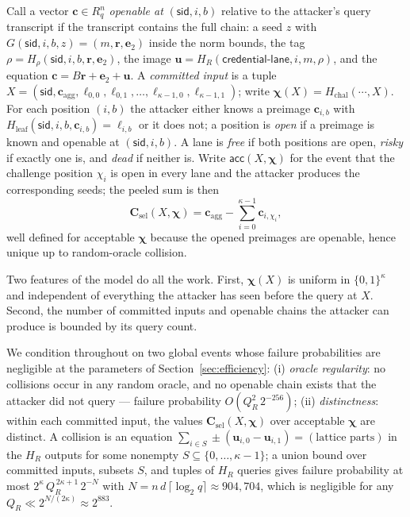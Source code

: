 \documentclass[11pt]{article}
\newcommand{\R}{R_q}
\begin{document}
Call a vector $\mathbf c\in\R^{n}$ \emph{openable at}
$(\mathsf{sid},i,b)$ relative to the attacker's query transcript if the
transcript contains the full chain: a seed $z$ with
$G(\mathsf{sid},i,b,z)=(m,\mathbf r,\mathbf e_2)$ inside the norm bounds,
the tag $\rho=H_\rho(\mathsf{sid},i,b,\mathbf r,\mathbf e_2)$, the image
$\mathbf u=H_R(\mathsf{credential\mbox{-}lane},i,m,\rho)$, and the equation
$\mathbf c=B\mathbf r+\mathbf e_2+\mathbf u$.  A \emph{committed input} is a
tuple $X=(\mathsf{sid},\mathbf c_{\mathrm{agg}},\ell_{0,0},\ell_{0,1},
\ldots,\ell_{\kappa-1,0},\ell_{\kappa-1,1})$; write
$\boldsymbol\chi(X)=H_{\mathrm{chal}}(\cdots,X)$.  For each position $(i,b)$
the attacker either knows a preimage $\mathbf c_{i,b}$ with
$H_{\mathrm{leaf}}(\mathsf{sid},i,b,\mathbf c_{i,b})=\ell_{i,b}$ or it does
not; a position is \emph{open} if a preimage is known and openable at
$(\mathsf{sid},i,b)$.  A lane is \emph{free} if both positions are open,
\emph{risky} if exactly one is, and \emph{dead} if neither is.  Write
$\mathsf{acc}(X,\boldsymbol\chi)$ for the event that the challenge position
$\chi_i$ is open in every lane and the attacker produces the corresponding
seeds; the peeled sum is then
\[
 \mathbf C_{\mathrm{sel}}(X,\boldsymbol\chi)
 =\mathbf c_{\mathrm{agg}}-\sum_{i=0}^{\kappa-1}\mathbf c_{i,\chi_i},
\]
well defined for acceptable $\boldsymbol\chi$ because the opened preimages
are openable, hence unique up to random-oracle collision.

Two features of the model do all the work.  First, $\boldsymbol\chi(X)$ is
uniform in $\{0,1\}^{\kappa}$ and independent of everything the attacker has
seen before the query at $X$.  Second, the number of
committed inputs and openable chains the attacker can produce is bounded by
its query count.

We condition throughout on two global events whose failure probabilities are
negligible at the parameters of Section~\ref{sec:efficiency}:
(i) \emph{oracle regularity}: no collisions occur in any random oracle, and
no openable chain exists that the attacker did not query --- failure
probability $O(Q_R^{2}\,2^{-256})$;
(ii) \emph{distinctness}: within each committed input, the values
$\mathbf C_{\mathrm{sel}}(X,\boldsymbol\chi)$ over acceptable
$\boldsymbol\chi$ are distinct.  A collision is an equation
$\sum_{i\in S}\pm(\mathbf u_{i,0}-\mathbf u_{i,1})=(\text{lattice parts})$
in the $H_R$ outputs for some nonempty $S\subseteq\{0,\ldots,\kappa-1\}$;
a union bound over committed inputs, subsets $S$, and tuples of $H_R$ queries
gives failure probability at most
$2^{\kappa}\,Q_R^{\,2\kappa+1}\,2^{-N}$ with
$N=n\,d\,\lceil\log_2 q\rceil\approx904{,}704$, which is negligible for any
$Q_R\ll 2^{N/(2\kappa)}\approx 2^{883}$.
\end{document}
